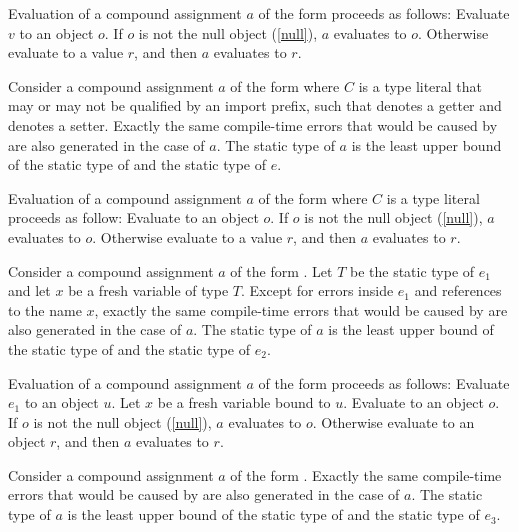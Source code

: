 \documentclass[makeidx]{article}
\begin{document}
\LMHash{}%
Evaluation of a compound assignment $a$ of the form 
proceeds as follows:
Evaluate $v$ to an object $o$.
If $o$ is not the null object (\ref{null}), $a$ evaluates to $o$.
Otherwise evaluate  to a value $r$,
and then $a$ evaluates to $r$.

\LMHash{}%
Consider a compound assignment $a$ of the form 
where $C$ is a type literal
that may or may not be qualified by an import prefix,
such that  denotes a getter and  denotes a setter.
Exactly the same compile-time errors that would be caused by  are also generated in the case of $a$.
The static type of $a$ is the least upper bound of the static type of  and the static type of $e$.

\LMHash{}%
Evaluation of a compound assignment $a$ of the form 
where $C$ is a type literal proceeds as follow:
Evaluate  to an object $o$.
If $o$ is not the null object (\ref{null}), $a$ evaluates to $o$.
Otherwise evaluate  to a value $r$,
and then $a$ evaluates to $r$.

\LMHash{}%
Consider a compound assignment $a$ of the form .
Let $T$ be the static type of $e_1$ and let $x$ be a fresh variable of type $T$.
Except for errors inside $e_1$ and references to the name $x$,
exactly the same compile-time errors that would be caused by  are also generated in the case of $a$.
The static type of $a$ is the least upper bound of the static type of  and the static type of $e_2$.

\LMHash{}%
Evaluation of a compound assignment $a$ of the form 
proceeds as follows:
Evaluate $e_1$ to an object $u$.
Let $x$ be a fresh variable bound to $u$.
Evaluate  to an object $o$.
If $o$ is not the null object (\ref{null}), $a$ evaluates to $o$.
Otherwise evaluate  to an object $r$,
and then $a$ evaluates to $r$.

\LMHash{}%
Consider a compound assignment $a$ of the form .
Exactly the same compile-time errors that would be caused by  are also generated in the case of $a$.
The static type of $a$ is the least upper bound of the static type of  and the static type of $e_3$.
\end{document}
